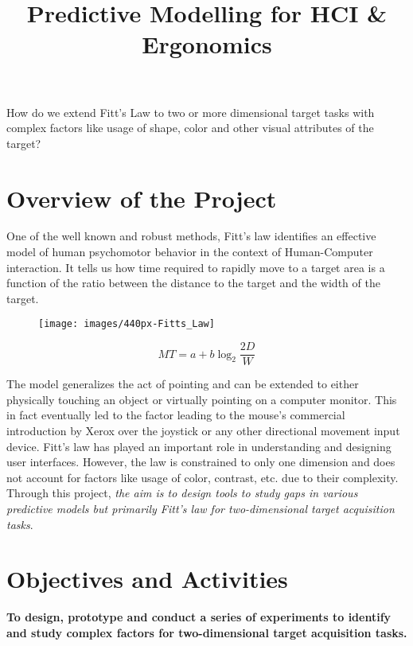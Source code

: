 \documentclass	[a4paper,11pt, hidelinks]{article}
\date			{\displaydate{date}}
\title{Predictive Modelling for HCI \& Ergonomics}
\theoremstyle	{definition}
\begin{document}
\maketitle
\thispagestyle{fancy}

\begin{large}How do we extend Fitt’s Law to two or more dimensional target tasks with complex factors like usage of shape, color and other visual attributes of the target?
\end{large}

\section{Overview of the Project}
One of the well known and robust methods, Fitt’s law identifies an effective model of human psychomotor behavior in the context of Human-Computer interaction. It tells us how time required to rapidly move to a target area is a function of the ratio between the distance to the target and the width of the target.\cite{fitts1954information}

\begin{figure}[h]
  \center
  \texttt{[image: images/440px-Fitts\_Law]}
\end{figure}

$$ MT = a + b \log_{2} \frac{2D}{W} $$

The model generalizes the act of pointing and can be extended to either physically touching an object or virtually pointing on a computer monitor. This in fact eventually led to the factor leading to the mouse’s commercial introduction by Xerox over the joystick or any other directional movement input device.\cite{stuart_crt} Fitt’s law has played an important role in understanding and designing user interfaces. However, the law is constrained to only one dimension and does not account for factors like usage of color, contrast, etc. due to their complexity. Through this project, \textit{the aim is to design tools to study gaps in various predictive models but primarily Fitt’s law for two-dimensional target acquisition tasks}.

\section{Objectives and Activities}
\textbf{To design, prototype and conduct a series of experiments to identify and study complex factors for two-dimensional target acquisition tasks.}
\end{document}
